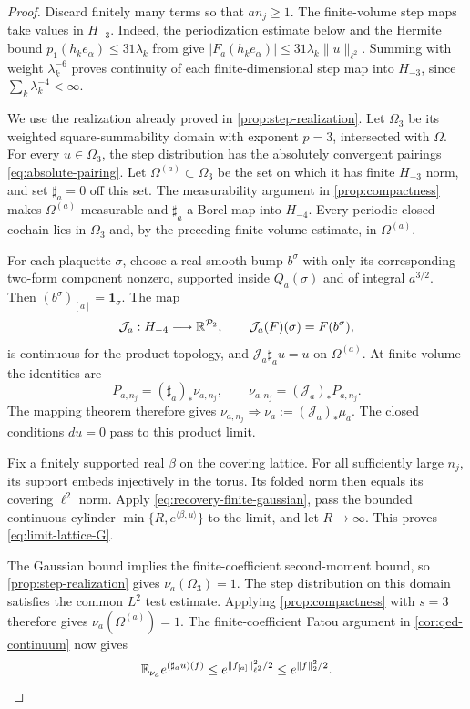 \begin{proof}
Discard finitely many terms so that $an_j\ge1$.
The finite-volume step maps take values in $H_{-3}$.
Indeed, the periodization estimate below and the Hermite bound
$p_1(h_ke_\alpha)\le31\lambda_k$ from
\cite[Section~3]{QED3Integration} give
$|F_a(h_ke_\alpha)|\le31\lambda_k\|u\|_{\ell^2}$.
Summing with weight $\lambda_k^{-6}$ proves continuity of
each finite-dimensional step map into $H_{-3}$, since
$\sum_k\lambda_k^{-4}<\infty$.

We use the realization already proved in
\cref{prop:step-realization}. Let $\Omega_3$ be its weighted
square-summability domain with exponent $p=3$, intersected with
$\Omega$. For every $u\in\Omega_3$, the step distribution has the
absolutely convergent pairings \eqref{eq:absolute-pairing}.
Let $\Omega^{(a)}\subset\Omega_3$ be the set on which it has
finite $H_{-3}$ norm, and set $\sharp_a=0$ off this set.
The measurability argument in \cref{prop:compactness} makes
$\Omega^{(a)}$ measurable and $\sharp_a$ a Borel map into $H_{-4}$.
Every periodic closed cochain lies in $\Omega_3$ and, by the preceding
finite-volume estimate, in $\Omega^{(a)}$.

For each plaquette $\sigma$, choose a real smooth bump $b^\sigma$
with only its corresponding two-form component nonzero, supported
inside $Q_a(\sigma)$ and of integral $a^{3/2}$. Then
$(b^\sigma)_{[a]}=\mathbf1_\sigma$. The map
\begin{equation}\label{eq:limit-step-inverse}
 \mathcal J_a:H_{-4}\longrightarrow\mathbb R^{\mathcal P_2},
 \qquad \mathcal J_a(F)(\sigma)=F(b^\sigma),
\end{equation}
is continuous for the product topology, and
$\mathcal J_a\sharp_a u=u$ on $\Omega^{(a)}$.
At finite volume the identities are
\[
 P_{a,n_j}=(\sharp_a)_*\nu_{a,n_j},\qquad
 \nu_{a,n_j}=(\mathcal J_a)_*P_{a,n_j}.
\]
The mapping theorem therefore gives
$\nu_{a,n_j}\Longrightarrow\nu_a:=(\mathcal J_a)_*\mu_a$.
The closed conditions $du=0$ pass to this product limit.

Fix a finitely supported real $\beta$ on the covering lattice.
For all sufficiently large $n_j$, its support embeds injectively
in the torus. Its folded norm then equals its covering
$\ell^2$ norm. Apply \eqref{eq:recovery-finite-gaussian}, pass
the bounded continuous cylinder
$\min\{R,e^{\langle\beta,u\rangle}\}$ to the limit, and let
$R\to\infty$. This proves \eqref{eq:limit-lattice-G}.

The Gaussian bound implies the finite-coefficient second-moment
bound, so \cref{prop:step-realization} gives $\nu_a(\Omega_3)=1$.
The step distribution on this domain satisfies the common
$L^2$ test estimate. Applying \cref{prop:compactness} with $s=3$
therefore gives $\nu_a(\Omega^{(a)})=1$.
The finite-coefficient Fatou argument in
\cref{cor:qed-continuum} now gives
\[
 \mathbb E_{\nu_a}e^{(\sharp_a u)(f)}
 \le e^{\|f_{[a]}\|_{\ell^2}^2/2}
 \le e^{\|f\|_2^2/2}.
\]


\end{proof}
